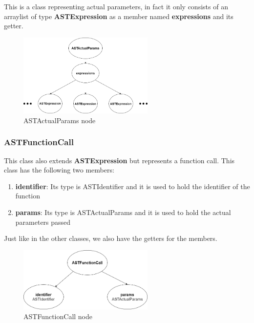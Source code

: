 \documentclass{article}
\begin{document}
					This is a class representing actual parameters, in fact it only consists of an arraylist of type \textbf{ASTExpression} as a member named \textbf{expressions} and its getter.
					
					\begin{figure}[H]
					\centering
			 			\includegraphics[width=0.6\textwidth]{astactualparams.png}
			  			\caption{ASTActualParams node}
			  			\label{fig:astactualparams}
					\end{figure}
					
					\subsubsection{ASTFunctionCall}
					
					This class also extends \textbf{ASTExpression} but represents a function call. This class has the following two members:
					
					\begin{enumerate}
					\item \textbf{identifier}: Its type is ASTIdentifier and it is used to hold the identifier of the function
					\item \textbf{params}: Its type is ASTActualParams and it is used to hold the actual parameters passed
					\end{enumerate}
					
					Just like in the other classes, we also have the getters for the members.
					
					\begin{figure}[H]
					\centering
			 			\includegraphics[width=0.6\textwidth]{astfunctioncall.png}
			  			\caption{ASTFunctionCall node}
			  			\label{fig:astfunctioncall}
					\end{figure}
						
\end{document}
